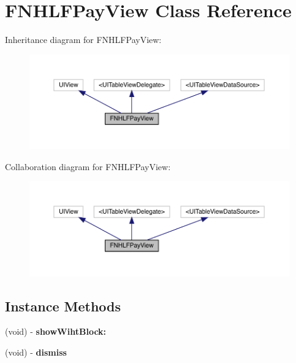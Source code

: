 \hypertarget{interface_f_n_h_l_f_pay_view}{}\section{F\+N\+H\+L\+F\+Pay\+View Class Reference}
\label{interface_f_n_h_l_f_pay_view}


Inheritance diagram for F\+N\+H\+L\+F\+Pay\+View\+:\nopagebreak
\begin{figure}[H]
\begin{center}
\leavevmode
\includegraphics[width=350pt]{interface_f_n_h_l_f_pay_view__inherit__graph}
\end{center}
\end{figure}


Collaboration diagram for F\+N\+H\+L\+F\+Pay\+View\+:\nopagebreak
\begin{figure}[H]
\begin{center}
\leavevmode
\includegraphics[width=350pt]{interface_f_n_h_l_f_pay_view__coll__graph}
\end{center}
\end{figure}
\subsection*{Instance Methods}
\begin{DoxyCompactItemize}
\item 
\mbox{\label{interface_f_n_h_l_f_pay_view_a170d7b7b5b2ef9db35ea98b8b1fbd548}} 
(void) -\/ {\bfseries show\+Wiht\+Block\+:}
\item 
\mbox{\label{interface_f_n_h_l_f_pay_view_a0ad2d286d1ce6eed10356639e884be8c}} 
(void) -\/ {\bfseries dismiss}
\end{DoxyCompactItemize}
